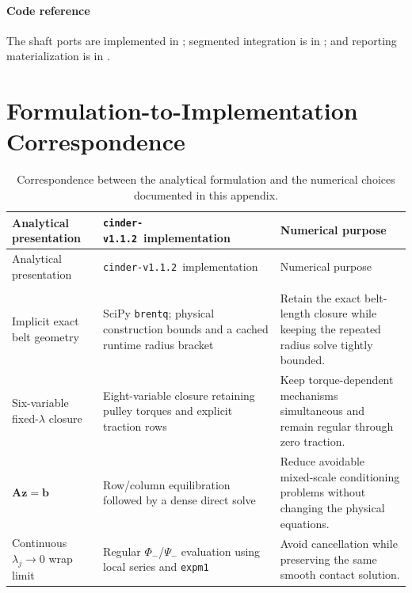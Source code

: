 \documentclass[11pt]{report}
\numberwithin{equation}{section}
\newcommand{\vect}[1]{\bm{#1}}
\newcommand{\CINDERtag}{\texttt{cinder-v1.1.2}}
\begin{document}
\paragraph{Code reference}
The shaft ports are implemented in
; segmented
integration is in
; and
reporting materialization is in
.

\section{Formulation-to-Implementation Correspondence}
\label{app:num_correspondence}

\begin{center}
\small
\setlength{\LTleft}{0pt}
\setlength{\LTright}{0pt}
\begin{longtable}{@{}>{\raggedright\arraybackslash}p{}>{\raggedright\arraybackslash}p{}>{\raggedright\arraybackslash}p{}@{}}
\toprule
Analytical presentation & \CINDERtag\ implementation & Numerical purpose \\ \midrule
\endfirsthead
\toprule
Analytical presentation & \CINDERtag\ implementation & Numerical purpose \\ \midrule
\endhead
\bottomrule
\endfoot
\bottomrule
\caption{Correspondence between the analytical formulation and the numerical choices documented in this appendix.}
\label{tab:appendix_numerical_correspondence}\\
\endlastfoot
Implicit exact belt geometry
& SciPy \texttt{brentq}; physical construction bounds and a cached runtime radius bracket
& Retain the exact belt-length closure while keeping the repeated radius solve tightly bounded. \\[5pt]
Six-variable fixed-$\lambda$ closure
& Eight-variable closure retaining pulley torques and explicit traction rows
& Keep torque-dependent mechanisms simultaneous and remain regular through zero traction. \\[5pt]
$\vect{A}\vect{z}=\vect{b}$
& Row/column equilibration followed by a dense direct solve
& Reduce avoidable mixed-scale conditioning problems without changing the physical equations. \\[5pt]
Continuous $\lambda_j\to0$ wrap limit
& Regular $\Phi_-$/$\Psi_-$ evaluation using local series and \texttt{expm1}
& Avoid cancellation while preserving the same smooth contact solution. \\[5pt]

\end{longtable}
\end{center}
\end{document}

